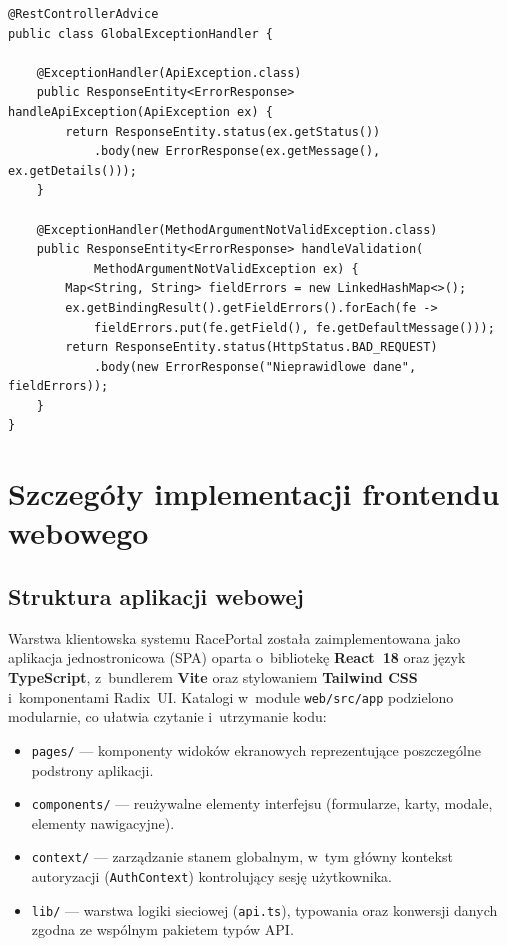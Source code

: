 \documentclass{sprz}
\begin{document}
\begin{lstlisting}[caption={Globalna obsługa \texttt{ApiException} i błędów \texttt{@Valid}},label={lst:backend-geh}]
@RestControllerAdvice
public class GlobalExceptionHandler {

    @ExceptionHandler(ApiException.class)
    public ResponseEntity<ErrorResponse> handleApiException(ApiException ex) {
        return ResponseEntity.status(ex.getStatus())
            .body(new ErrorResponse(ex.getMessage(), ex.getDetails()));
    }

    @ExceptionHandler(MethodArgumentNotValidException.class)
    public ResponseEntity<ErrorResponse> handleValidation(
            MethodArgumentNotValidException ex) {
        Map<String, String> fieldErrors = new LinkedHashMap<>();
        ex.getBindingResult().getFieldErrors().forEach(fe ->
            fieldErrors.put(fe.getField(), fe.getDefaultMessage()));
        return ResponseEntity.status(HttpStatus.BAD_REQUEST)
            .body(new ErrorResponse("Nieprawidlowe dane", fieldErrors));
    }
}
\end{lstlisting}

\chapter{Szczegóły implementacji frontendu webowego}
\label{ch:frontend}
\section{Struktura aplikacji webowej}
Warstwa klientowska systemu RacePortal została zaimplementowana jako aplikacja jednostronicowa (SPA) oparta o~bibliotekę \textbf{React~18} oraz język \textbf{TypeScript}, z~bundlerem \textbf{Vite} oraz stylowaniem \textbf{Tailwind CSS} i~komponentami Radix~UI. Katalogi w~module \texttt{web/src/app} podzielono modularnie, co ułatwia czytanie i~utrzymanie kodu:
\begin{itemize}
  \item \texttt{pages/} --- komponenty widoków ekranowych reprezentujące poszczególne podstrony aplikacji.
  \item \texttt{components/} --- reużywalne elementy interfejsu (formularze, karty, modale, elementy nawigacyjne).
  \item \texttt{context/} --- zarządzanie stanem globalnym, w~tym główny kontekst autoryzacji (\texttt{AuthContext}) kontrolujący sesję użytkownika.
  \item \texttt{lib/} --- warstwa logiki sieciowej (\texttt{api.ts}), typowania oraz konwersji danych zgodna ze wspólnym pakietem typów API.
\end{itemize}
\end{document}
